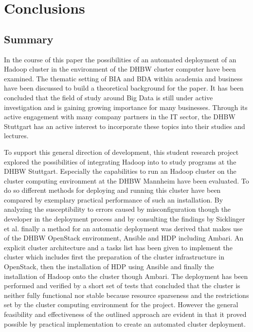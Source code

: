 \chapter{Conclusions}
\label{chap:conc}

\section{Summary}

In the course of this paper the possibilities of an automated deployment of an Hadoop cluster in the environment of the \ac{DHBW} cluster computer have been examined.
The thematic setting of \ac{BIA} and \ac{BDA} within academia and business have been discussed to build a theoretical background for the paper. 
It has been concluded that the field of study around Big Data is still under active investigation and is gaining growing importance for many businesses.
Through its active engagement with many company partners in the \ac{IT} sector, the \ac{DHBW} Stuttgart has an active interest to incorporate these topics into their studies and lectures.

To support this general direction of development, this student research project explored the possibilities of integrating Hadoop into to study programs at the \ac{DHBW} Stuttgart.
Especially the capabilities to run an Hadoop cluster on the cluster computing environment at the \ac{DHBW} Mannheim have been evaluated.
To do so different methods for deploying and running this cluster have been compared 
by exemplary practical performance of such an installation. 
By analyzing the susceptibility to errors caused by misconfiguration though the developer in the deployment process and by consulting the findings by Sicklinger et al. finally a method for an automatic deployment was derived that makes use of the \ac{DHBW} OpenStack environment, Ansible and \acf{HDP} including Ambari.
An explicit cluster architecture and a tasks list has been given to implement the cluster which includes first the preparation of the cluster infrastructure in OpenStack, then the installation of \ac{HDP} using Ansible and finally the installation of Hadoop onto the cluster though Ambari.
The deployment has been performed and verified by a short set of tests that concluded that the cluster is neither fully functional nor stable because resource sparseness and the restrictions set by the cluster computing environment for the project.
However the general feasibility and effectiveness of the outlined approach are evident in that it proved possible by practical implementation to create an automated cluster deployment.

